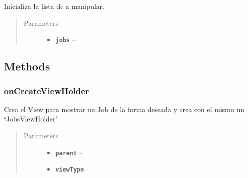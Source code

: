 \documentclass[letterpaper,10pt,english]{sphinxmanual}
\begin{document}
\begin{fulllineitems}
\label{Adapter/JobsAdapter:com.fiuba.tallerii.jobify.JobsAdapter.JobsAdapter(List)}
Inicializa la lista de  a manipular.
\begin{quote}\begin{description}
\item[{Parameters}] \leavevmode\begin{itemize}
\item {} 
\textbf{\texttt{jobs}} -- 

\end{itemize}

\end{description}\end{quote}

\end{fulllineitems}



\subsection{Methods}
\label{Adapter/JobsAdapter:methods}

\subsubsection{onCreateViewHolder}
\label{Adapter/JobsAdapter:oncreateviewholder}

\begin{fulllineitems}
\label{Adapter/JobsAdapter:com.fiuba.tallerii.jobify.JobsAdapter.onCreateViewHolder(ViewGroup, int)}
Crea el View para mostrar un Job de la forma deseada y crea con el mismo un {\color{red}\bfseries{}{}`}JobsViewHolder'
\begin{quote}\begin{description}
\item[{Parameters}] \leavevmode\begin{itemize}
\item {} 
\textbf{\texttt{parent}} -- 

\item {} 
\textbf{\texttt{viewType}} -- 

\end{itemize}

\end{description}\end{quote}

\end{fulllineitems}
\end{document}
